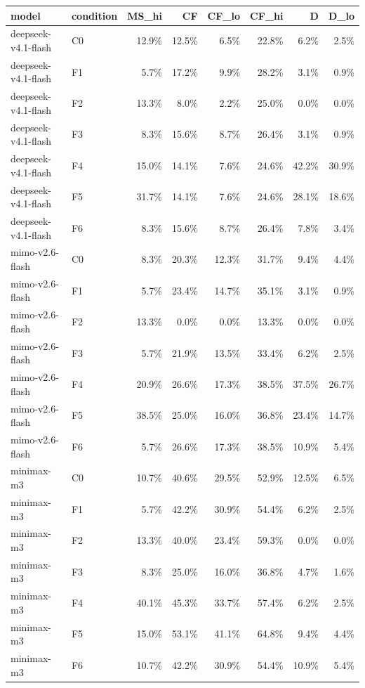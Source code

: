 \begin{tabular}{llrrrrrr}
\toprule
model & condition & MS\_hi & CF & CF\_lo & CF\_hi & D & D\_lo \\
\midrule
deepseek-v4.1-flash & C0 & 12.9\% & 12.5\% & 6.5\% & 22.8\% & 6.2\% & 2.5\% \\
deepseek-v4.1-flash & F1 & 5.7\% & 17.2\% & 9.9\% & 28.2\% & 3.1\% & 0.9\% \\
deepseek-v4.1-flash & F2 & 13.3\% & 8.0\% & 2.2\% & 25.0\% & 0.0\% & 0.0\% \\
deepseek-v4.1-flash & F3 & 8.3\% & 15.6\% & 8.7\% & 26.4\% & 3.1\% & 0.9\% \\
deepseek-v4.1-flash & F4 & 15.0\% & 14.1\% & 7.6\% & 24.6\% & 42.2\% & 30.9\% \\
deepseek-v4.1-flash & F5 & 31.7\% & 14.1\% & 7.6\% & 24.6\% & 28.1\% & 18.6\% \\
deepseek-v4.1-flash & F6 & 8.3\% & 15.6\% & 8.7\% & 26.4\% & 7.8\% & 3.4\% \\
mimo-v2.6-flash & C0 & 8.3\% & 20.3\% & 12.3\% & 31.7\% & 9.4\% & 4.4\% \\
mimo-v2.6-flash & F1 & 5.7\% & 23.4\% & 14.7\% & 35.1\% & 3.1\% & 0.9\% \\
mimo-v2.6-flash & F2 & 13.3\% & 0.0\% & 0.0\% & 13.3\% & 0.0\% & 0.0\% \\
mimo-v2.6-flash & F3 & 5.7\% & 21.9\% & 13.5\% & 33.4\% & 6.2\% & 2.5\% \\
mimo-v2.6-flash & F4 & 20.9\% & 26.6\% & 17.3\% & 38.5\% & 37.5\% & 26.7\% \\
mimo-v2.6-flash & F5 & 38.5\% & 25.0\% & 16.0\% & 36.8\% & 23.4\% & 14.7\% \\
mimo-v2.6-flash & F6 & 5.7\% & 26.6\% & 17.3\% & 38.5\% & 10.9\% & 5.4\% \\
minimax-m3 & C0 & 10.7\% & 40.6\% & 29.5\% & 52.9\% & 12.5\% & 6.5\% \\
minimax-m3 & F1 & 5.7\% & 42.2\% & 30.9\% & 54.4\% & 6.2\% & 2.5\% \\
minimax-m3 & F2 & 13.3\% & 40.0\% & 23.4\% & 59.3\% & 0.0\% & 0.0\% \\
minimax-m3 & F3 & 8.3\% & 25.0\% & 16.0\% & 36.8\% & 4.7\% & 1.6\% \\
minimax-m3 & F4 & 40.1\% & 45.3\% & 33.7\% & 57.4\% & 6.2\% & 2.5\% \\
minimax-m3 & F5 & 15.0\% & 53.1\% & 41.1\% & 64.8\% & 9.4\% & 4.4\% \\
minimax-m3 & F6 & 10.7\% & 42.2\% & 30.9\% & 54.4\% & 10.9\% & 5.4\% \\

\end{tabular}
